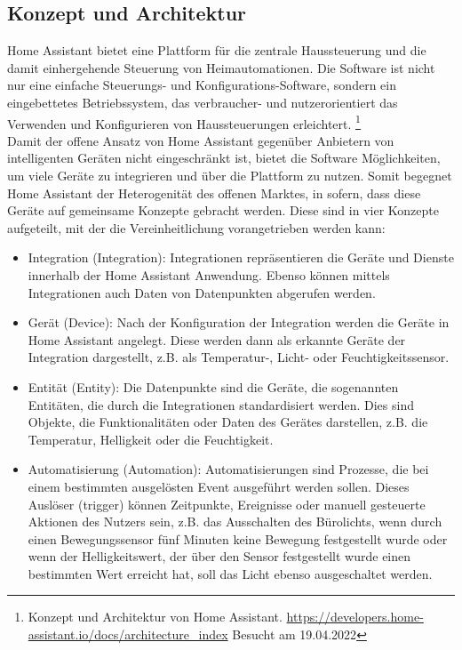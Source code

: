 \subsection{Konzept und Architektur}
\label{sec:conceptArchitectureHAOS}
    Home Assistant bietet eine Plattform für die zentrale Haussteuerung und die damit einhergehende Steuerung von Heimautomationen. Die 
    Software ist nicht nur eine einfache Steuerungs- und Konfigurations-Software, sondern ein eingebettetes Betriebssystem, das 
    verbraucher- und nutzerorientiert das Verwenden und Konfigurieren von Haussteuerungen erleichtert. \footnote{Konzept und Architektur von Home Assistant. \url{https://developers.home-assistant.io/docs/architecture_index} Besucht am 19.04.2022}
    \\
    \linebreak
    Damit der offene Ansatz von Home Assistant gegenüber Anbietern von intelligenten Geräten nicht eingeschränkt ist, bietet die Software Möglichkeiten, um viele 
    Geräte zu integrieren und über die Plattform zu nutzen. Somit begegnet Home Assistant der Heterogenität des offenen Marktes, in sofern, dass diese Geräte auf  
    gemeinsame Konzepte gebracht werden. Diese sind in vier Konzepte %
    aufgeteilt, mit der die Vereinheitlichung vorangetrieben werden kann: 
    \begin{itemize}
        \item Integration (Integration): Integrationen repräsentieren die Geräte und Dienste innerhalb der Home Assistant Anwendung. 
              Ebenso können mittels Integrationen auch Daten von Datenpunkten abgerufen werden.
        \item Gerät (Device): Nach der Konfiguration der Integration werden die Geräte in Home Assistant angelegt. 
              Diese werden dann als erkannte Geräte der Integration dargestellt, z.B. als Temperatur-, Licht- oder Feuchtigkeitssensor.
        \item Entität (Entity): Die Datenpunkte sind die Geräte, die sogenannten Entitäten, die durch die Integrationen standardisiert werden. 
              Dies sind Objekte, die Funktionalitäten oder Daten des Gerätes darstellen, z.B. die Temperatur, Helligkeit oder die Feuchtigkeit.
        \item Automatisierung (Automation): Automatisierungen sind Prozesse, die bei einem bestimmten ausgelösten Event ausgeführt werden 
              sollen. Dieses Auslöser (trigger) können Zeitpunkte, Ereignisse oder manuell gesteuerte Aktionen des Nutzers sein, z.B. das 
              Ausschalten des Bürolichts, wenn durch einen Bewegungssensor fünf Minuten keine Bewegung festgestellt wurde oder wenn der 
              Helligkeitswert, der über den Sensor festgestellt wurde einen bestimmten Wert erreicht hat, soll das Licht ebenso 
              ausgeschaltet werden.
    \end{itemize}
